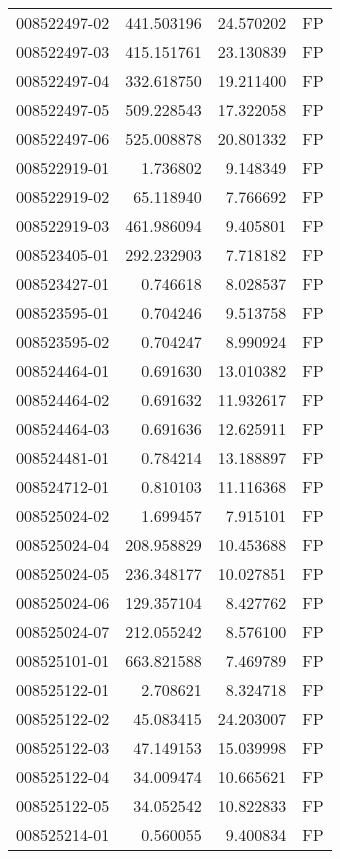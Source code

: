 \begin{tabular}{lrrl}
008522497-02 &  441.503196 &    24.570202 &   FP \\
008522497-03 &  415.151761 &    23.130839 &   FP \\
008522497-04 &  332.618750 &    19.211400 &   FP \\
008522497-05 &  509.228543 &    17.322058 &   FP \\
008522497-06 &  525.008878 &    20.801332 &   FP \\
008522919-01 &    1.736802 &     9.148349 &   FP \\
008522919-02 &   65.118940 &     7.766692 &   FP \\
008522919-03 &  461.986094 &     9.405801 &   FP \\
008523405-01 &  292.232903 &     7.718182 &   FP \\
008523427-01 &    0.746618 &     8.028537 &   FP \\
008523595-01 &    0.704246 &     9.513758 &   FP \\
008523595-02 &    0.704247 &     8.990924 &   FP \\
008524464-01 &    0.691630 &    13.010382 &   FP \\
008524464-02 &    0.691632 &    11.932617 &   FP \\
008524464-03 &    0.691636 &    12.625911 &   FP \\
008524481-01 &    0.784214 &    13.188897 &   FP \\
008524712-01 &    0.810103 &    11.116368 &   FP \\
008525024-02 &    1.699457 &     7.915101 &   FP \\
008525024-04 &  208.958829 &    10.453688 &   FP \\
008525024-05 &  236.348177 &    10.027851 &   FP \\
008525024-06 &  129.357104 &     8.427762 &   FP \\
008525024-07 &  212.055242 &     8.576100 &   FP \\
008525101-01 &  663.821588 &     7.469789 &   FP \\
008525122-01 &    2.708621 &     8.324718 &   FP \\
008525122-02 &   45.083415 &    24.203007 &   FP \\
008525122-03 &   47.149153 &    15.039998 &   FP \\
008525122-04 &   34.009474 &    10.665621 &   FP \\
008525122-05 &   34.052542 &    10.822833 &   FP \\
008525214-01 &    0.560055 &     9.400834 &   FP \\

\end{tabular}
